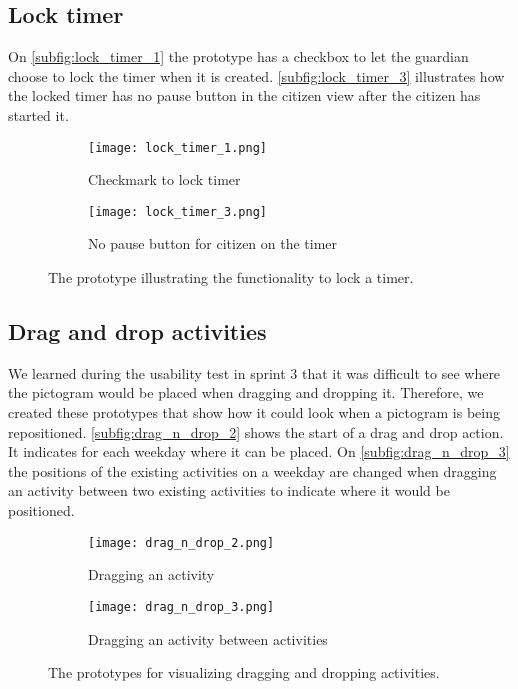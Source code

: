\subsection{Lock timer}
On \autoref{subfig:lock_timer_1} the prototype has a checkbox to let the guardian choose to lock the timer when it is created.
\autoref{subfig:lock_timer_3} illustrates how the locked timer has no pause button in the citizen view after the citizen has started it. 
\begin{figure}[H]
    \begin{subfigure}{0.5\textwidth}
    \texttt{[image: lock\_timer\_1.png]}
    \caption{Checkmark to lock timer}
    \label{subfig:lock_timer_1}
    \end{subfigure}
    \begin{subfigure}{0.5\textwidth}
        \texttt{[image: lock\_timer\_3.png]}
    \caption{No pause button for citizen on the timer}
    \label{subfig:lock_timer_3}
    \end{subfigure} 
    \caption{The prototype illustrating the functionality to lock a timer.}
    \label{fig:lock_timer}
\end{figure}

\subsection{Drag and drop activities}
We learned during the usability test in sprint 3 that it was difficult to see where the pictogram would be placed when dragging and dropping it.
Therefore, we created these prototypes that show how it could look when a pictogram is being repositioned.
\autoref{subfig:drag_n_drop_2} shows the start of a drag and drop action.
It indicates for each weekday where it can be placed. 
On \autoref{subfig:drag_n_drop_3} the positions of the existing activities on a weekday are changed when dragging an activity between two existing activities to indicate where it would be positioned.
\begin{figure}[H]
    \begin{subfigure}{0.5\textwidth}
    \texttt{[image: drag\_n\_drop\_2.png]}
    \caption{Dragging an activity}
    \label{subfig:drag_n_drop_2}
    \end{subfigure}
    \begin{subfigure}{0.5\textwidth}
        \texttt{[image: drag\_n\_drop\_3.png]}
    \caption{Dragging an activity between activities}
    \label{subfig:drag_n_drop_3}
    \end{subfigure} 
    \caption{The prototypes for visualizing dragging and dropping activities.}
    \label{fig:drag_n_drop}
\end{figure}

